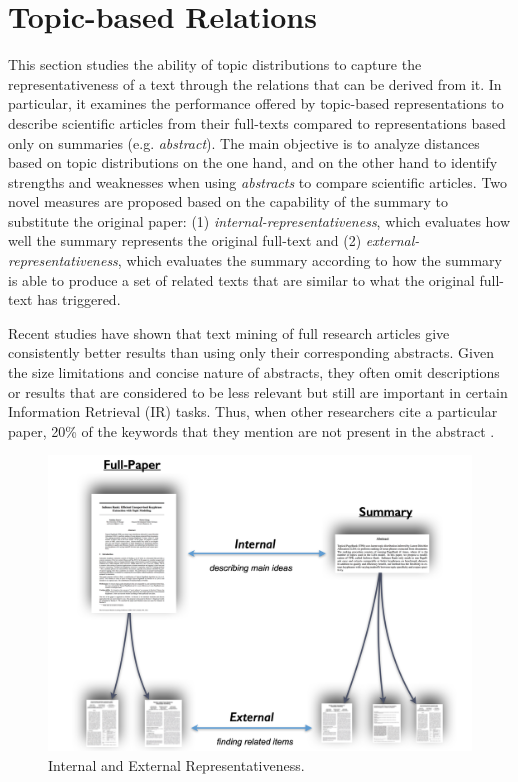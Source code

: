 \section{Topic-based Relations}
\label{sec:topic-relations}

This section studies the ability of topic distributions to capture the representativeness of a text through the relations that can be derived from it. In particular, it examines the performance offered by topic-based representations to describe scientific articles from their full-texts compared to representations based only on summaries (e.g. \textit{abstract}). The main objective is to analyze distances based on topic distributions on the one hand, and on the other hand to identify strengths and weaknesses when using \textit{abstracts} to compare scientific articles. Two novel measures are proposed based on the capability of the summary to substitute the original paper: (1) \textit{internal-representativeness}, which evaluates how well the summary represents the original full-text and (2) \textit{external-representativeness}, which evaluates the summary according to how the summary is able to produce a  set of related texts that are similar to what the original full-text has triggered.

Recent studies \citep{Westergaard2017, Sciences2016} have shown that text mining of full research articles give consistently better results than using only their corresponding abstracts. Given the size limitations and concise nature of abstracts, they often omit descriptions or results that are considered to be less relevant but still are important in certain Information Retrieval (IR) tasks. Thus, when other researchers cite a particular paper, 20\% of the keywords that they mention are not present in the abstract \citep{Divoli2012}.

\begin{figure}[!htbp]
\centering
\includegraphics[scale=0.24]{internal-external.png}
\caption{Internal and External Representativeness. }
\label{fig:representativeness}
\end{figure}


